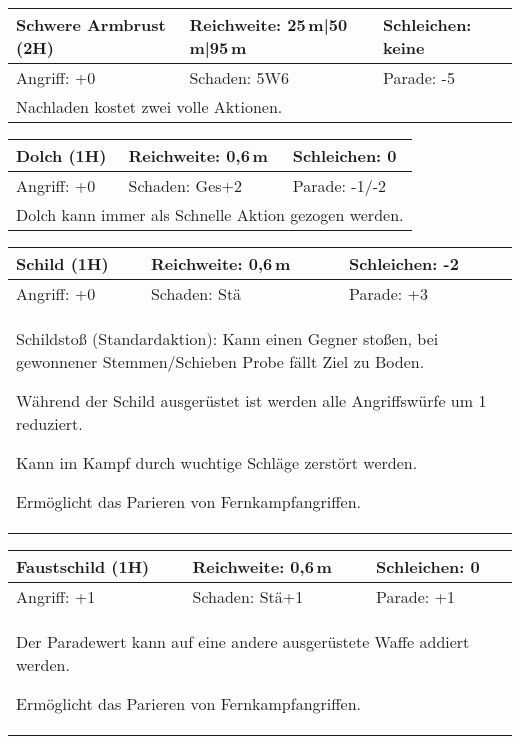 \documentclass[../../Heldenanleitung2]{subfiles}
\begin{document}
\begin{tabular}{|p{}|p{}|p{}|}
\hline
\textbf{Schwere Armbrust (2H)} & Reichweite: 25\,m|50\,m|95\,m & Schleichen: keine\\
\hline
Angriff: +0 & Schaden: 5W6 & Parade: -5\\
\hline
\multicolumn{3}{|p{0.99\textwidth}|}{Nachladen kostet zwei volle Aktionen.} \\
\hline
\end{tabular}
\newline \newline\newline
\begin{tabular}{|p{}|p{}|p{}|}
\hline
\textbf{Dolch (1H)} & Reichweite: 0,6\,m & Schleichen: 0\\
\hline
Angriff: +0 & Schaden: Ges+2 & Parade: -1/-2\\
\hline
\multicolumn{3}{|p{0.99\textwidth}|}{Dolch kann immer als Schnelle Aktion gezogen werden.} \\
\hline
\end{tabular}
\newline \newline\newline
\begin{tabular}{|p{}|p{}|p{}|}
\hline
\textbf{Schild (1H)} & Reichweite: 0,6\,m & Schleichen: -2 \\
\hline
Angriff: +0 & Schaden: Stä & Parade: +3\\
\hline
\multicolumn{3}{|p{0.99\textwidth}|}{Schildstoß (Standardaktion): Kann einen Gegner stoßen, bei gewonnener Stemmen/Schieben Probe fällt Ziel zu Boden. 

Während der Schild ausgerüstet ist werden alle Angriffswürfe um 1 reduziert.

Kann im Kampf durch wuchtige Schläge zerstört werden.

Ermöglicht das Parieren von Fernkampfangriffen.
}\\
\hline
\end{tabular}
\newline \newline\newline
\begin{tabular}{|p{}|p{}|p{}|}
\hline
\textbf{Faustschild (1H)} & Reichweite: 0,6\,m & Schleichen: 0 \\
\hline
Angriff: +1 & Schaden: Stä+1 & Parade: +1\\
\hline
\multicolumn{3}{|p{0.99\textwidth}|}{
Der Paradewert kann auf eine andere ausgerüstete Waffe addiert werden.

Ermöglicht das Parieren von Fernkampfangriffen.
} \\
\hline
\end{tabular}
\end{document}
